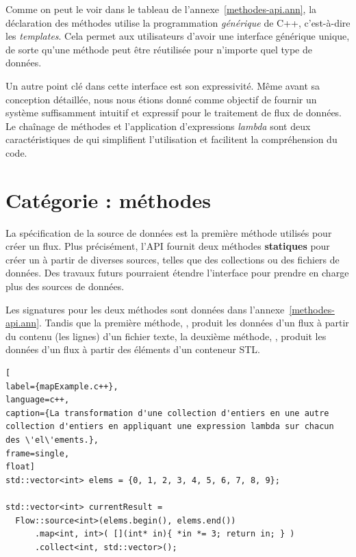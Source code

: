 Comme on peut le voir dans le tableau de l'annexe~\ref{methodes-api.ann}, la d\'eclaration des m\'ethodes utilise la programmation \emph{g\'en\'erique} de C++, c'est-\`a-dire les \emph{templates}. Cela permet aux utilisateurs d'avoir une interface g\'en\'erique unique, de sorte qu'une m\'ethode peut \^etre r\'eutilis\'ee pour n'importe quel type de donn\'ees.


Un autre point cl\'e dans cette interface est son expressivit\'e. M\^eme avant sa conception d\'etaill\'ee, nous nous \'etions donn\'e comme objectif de fournir un syst\`eme suffisamment intuitif et expressif pour le traitement de flux de donn\'ees. Le cha\^inage de m\'ethodes et l'application d'expressions \emph{lambda} sont deux caract\'eristiques de  qui simplifient l'utilisation et facilitent la compr\'ehension du code.


\section{Cat\'egorie  : m\'ethodes }

\label{source.sect}

La sp\'ecification de la source de donn\'ees est la premi\`ere m\'ethode utilis\'es pour cr\'eer un flux. Plus pr\'ecis\'ement, l'API fournit deux m\'ethodes {\bf statiques} pour cr\'eer un  \`a partir de diverses sources, telles que des collections ou des fichiers de donn\'ees. Des travaux futurs pourraient \'etendre l'interface pour prendre en charge plus des sources de donn\'ees.

Les signatures pour les deux m\'ethodes sont donn\'ees dans l'annexe~\ref{methodes-api.ann}. Tandis que la premi\`ere m\'ethode, , produit les donn\'ees d'un flux \`a partir du contenu (les lignes) d'un fichier texte, la deuxi\`eme m\'ethode, , produit les donn\'ees d'un flux \`a partir des \'el\'ements d'un conteneur STL.

\begin{lstlisting}[
label={mapExample.c++},
language=c++,
caption={La transformation d'une collection d'entiers en une autre collection d'entiers en appliquant une expression lambda sur chacun des \'el\'ements.},
frame=single,
float]
std::vector<int> elems = {0, 1, 2, 3, 4, 5, 6, 7, 8, 9};

std::vector<int> currentResult =
  Flow::source<int>(elems.begin(), elems.end())
      .map<int, int>( [](int* in){ *in *= 3; return in; } )
      .collect<int, std::vector>();            
\end{lstlisting}

